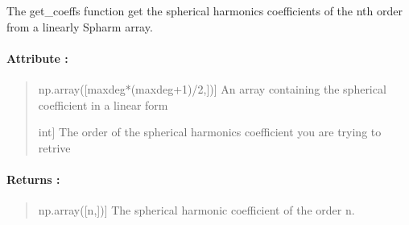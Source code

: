 \documentclass[letterpaper,10pt,english]{sphinxmanual}
\begin{document}
\begin{fulllineitems}
\label{\detokenize{spharm_doc:SL_C0de.spharm.get_coeffs}}
\pysigstartsignatures
{}
\pysigstopsignatures
\sphinxAtStartPar
The \label{\detokenize{spharm_doc:get-coeffs}}get\_coeffs function get the spherical harmonics coefficients of the nth order from a linearly Spharm array.


\paragraph{Attribute :}
\label{\detokenize{spharm_doc:attribute}}\begin{quote}
\begin{description}
\sphinxlineitem{a\_lm}{[}np.array({[}maxdeg*(maxdeg+1)/2,{]}){]}
\sphinxAtStartPar
An array containing the spherical coefficient in a linear form

\sphinxlineitem{n}{[}int{]}
\sphinxAtStartPar
The order of the spherical harmonics coefficient you are trying to retrive

\end{description}
\end{quote}


\paragraph{Returns :}
\label{\detokenize{spharm_doc:returns}}\begin{quote}
\begin{description}
\sphinxlineitem{a\_n}{[}np.array({[}n,{]}){]}
\sphinxAtStartPar
The spherical harmonic coefficient of the order n.

\end{description}
\end{quote}

\end{fulllineitems}



\subsubsection{}
\label{\detokenize{spharm_doc:class}}
\end{document}

